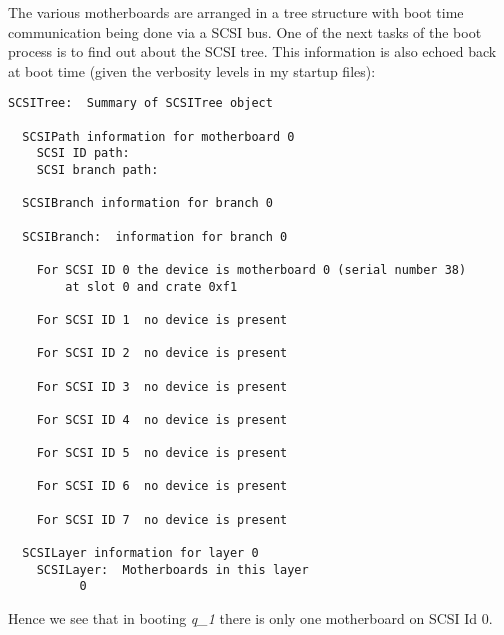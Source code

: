 The various motherboards are arranged in a tree structure with
boot time communication being done via a SCSI bus. One of the
next tasks of the boot process is to find out about the SCSI tree.
This information is also echoed back at boot time (given the verbosity
levels in my startup files):
\begin{verbatim}
SCSITree:  Summary of SCSITree object

  SCSIPath information for motherboard 0
    SCSI ID path:       
    SCSI branch path:   

  SCSIBranch information for branch 0

  SCSIBranch:  information for branch 0

    For SCSI ID 0 the device is motherboard 0 (serial number 38)
        at slot 0 and crate 0xf1

    For SCSI ID 1  no device is present

    For SCSI ID 2  no device is present

    For SCSI ID 3  no device is present

    For SCSI ID 4  no device is present

    For SCSI ID 5  no device is present

    For SCSI ID 6  no device is present

    For SCSI ID 7  no device is present

  SCSILayer information for layer 0
    SCSILayer:  Motherboards in this layer
          0
\end{verbatim}
Hence we see that in booting {\em q\_1} there is only one motherboard
on SCSI Id 0.

